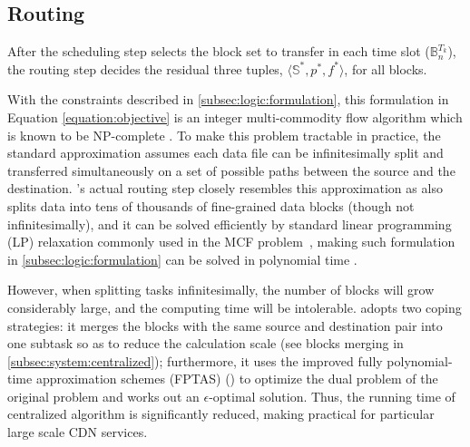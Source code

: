 \subsection{Routing}
\label{subsec:logic:routing}

After the scheduling step selects the block set to transfer in each time slot ($\mathbb{B}^{T_k}_n$), the routing step decides the residual three tuples, $\langle \mathbb{S}^*, p^*, f^* \rangle$, for all blocks.

With the constraints described in \Section\ref{subsec:logic:formulation}, this formulation in Equation \ref{equation:objective} is an integer multi-commodity flow algorithm which is known to be NP-complete \cite{garg1997primal}.
To make this problem tractable in practice,
the standard approximation assumes each data file can be infinitesimally split and transferred simultaneously on a set of possible paths between the source and the destination.
\name's actual routing step closely resembles this approximation as \name also splits data into tens of thousands of fine-grained data blocks (though not infinitesimally), and it can be solved efficiently by standard linear programming (LP) relaxation commonly used in the MCF problem~\cite{garg2007faster},
making such formulation in \Section\ref{subsec:logic:formulation} can be solved in polynomial time \cite{reed2012traffic}.

However, when splitting tasks infinitesimally, the number of blocks will grow considerably large, and the computing time will be intolerable. \name adopts two coping strategies: it merges the blocks with the same source and destination pair into one subtask so as to reduce the calculation scale (see blocks merging in \Section\ref{subsec:system:centralized}); furthermore, it uses the improved fully polynomial-time approximation schemes (FPTAS) (\cite{fleischer2000approximating}) to optimize the dual problem of the original problem and works out an $\epsilon$-optimal solution. Thus, the running time of centralized algorithm is significantly reduced, making \name practical for particular large scale CDN services.
